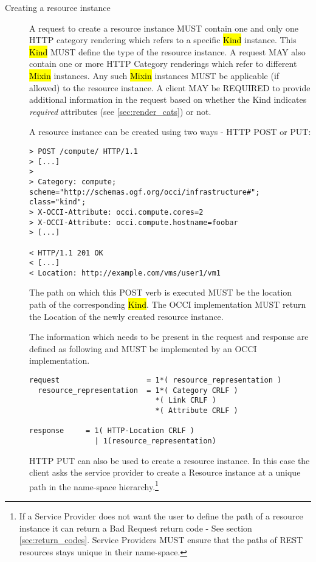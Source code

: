 \documentclass[10pt,a4paper]{article}
\begin{document}
\begin{description}
  \item[Creating a resource instance] A request to create a resource
    instance MUST contain one and only one HTTP category rendering
    which refers to a specific \hl{Kind} instance. This \hl{Kind}
    MUST define the type of the resource instance.  A request 
    MAY also contain one or more HTTP Category
    renderings which refer to different \hl{Mixin} instances. Any such
    \hl{Mixin} instances MUST be applicable (if allowed) to the
    resource instance.  A client MAY be REQUIRED to provide additional
    information in the request based on whether the Kind indicates 
    \emph{required} attributes (see \ref{sec:render_cats}) or not.
    
    A resource instance can be created using two ways - HTTP POST
    or PUT:

\begin{verbatim}
> POST /compute/ HTTP/1.1
> [...]
> 
> Category: compute; scheme="http://schemas.ogf.org/occi/infrastructure#"; class="kind"; 
> X-OCCI-Attribute: occi.compute.cores=2
> X-OCCI-Attribute: occi.compute.hostname=foobar
> [...]
 
< HTTP/1.1 201 OK
< [...]
< Location: http://example.com/vms/user1/vm1
\end{verbatim}

    The path on which this POST verb is executed MUST be the location
    path of the corresponding \hl{Kind}. The OCCI
    implementation MUST return the Location of the newly created
    resource instance.

    The information which needs to be present in the request and
    response are defined as following and MUST be implemented by an
    OCCI implementation.

\begin{verbatim}
request                    = 1*( resource_representation )
  resource_representation  = 1*( Category CRLF )
                             *( Link CRLF )
                             *( Attribute CRLF )

response     = 1( HTTP-Location CRLF ) 
               | 1(resource_representation)
\end{verbatim}

    HTTP PUT can also be used to create a resource instance. In this
    case the client asks the service provider to create a Resource
    instance at a unique path in the name-space hierarchy.\footnote{If
      a Service Provider does not want the user to define the path of
      a resource instance it can return a Bad Request return code -
      See section \ref{sec:return_codes}. Service Providers MUST
      ensure that the paths of REST resources stays unique in their
      name-space.}


\end{description}
\end{document}
